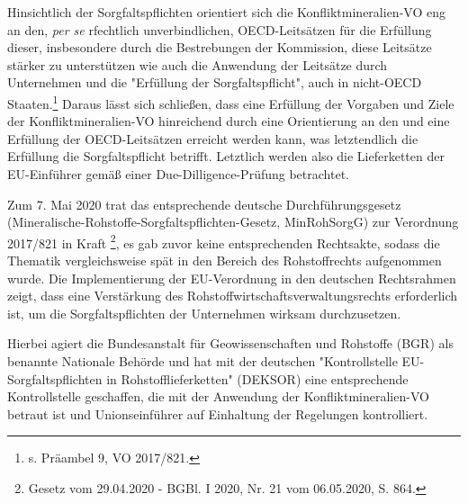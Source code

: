 \documentclass[12pt,a4paper,oneside]{book} %
\begin{document}
{	Hinsichtlich der Sorgfaltspflichten orientiert sich die Konfliktmineralien-VO eng an den, \textit{per se} rfechtlich unverbindlichen, OECD-Leitsätzen \autocite{OECDleitfaden2019} für die Erfüllung dieser, insbesondere durch die Bestrebungen der Kommission, diese Leitsätze stärker zu unterstützen wie auch die Anwendung der Leitsätze durch Unternehmen und die "Erfüllung der Sorgfaltspflicht", auch in nicht-OECD Staaten.\footnote{s. Präambel 9, VO 2017/821.} Daraus lässt sich schließen, dass eine Erfüllung der Vorgaben und Ziele der Konfliktmineralien-VO hinreichend durch eine Orientierung an den und eine Erfüllung der OECD-Leitsätzen erreicht werden kann, was letztendlich die Erfüllung die Sorgfaltspflicht betrifft. Letztlich werden also die Lieferketten der EU-Einführer gemäß einer Due-Dilligence-Prüfung betrachtet.\autocite[Rn. 390]{ruttloff_lieferkettensorgfaltspflichtengesetz_2022}
	
	
	
	Zum 7. Mai 2020 trat das entsprechende deutsche Durchführungsgesetz (Mineralische-Rohstoffe-Sorgfaltspflichten-Gesetz, MinRohSorgG) zur Verordnung 2017/821 in Kraft \footnote{Gesetz vom 29.04.2020 - BGBl. I 2020, Nr. 21 vom 06.05.2020, S. 864.}, es gab zuvor keine entsprechenden Rechtsakte, sodass die Thematik vergleichsweise spät in den Bereich des Rohstoffrechts aufgenommen wurde. Die Implementierung der EU-Verordnung in den deutschen Rechtsrahmen zeigt, dass eine Verstärkung des Rohstoffwirtschaftsverwaltungsrechts erforderlich ist, um die Sorgfaltspflichten der Unternehmen wirksam durchzusetzen.
	
	Hierbei agiert die Bundesanstalt für Geowissenschaften und Rohstoffe (BGR) als benannte Nationale Behörde und hat mit der deutschen "Kontrollstelle EU-Sorgfaltspflichten in Rohstofflieferketten" (DEKSOR) eine entsprechende Kontrollstelle geschaffen, die mit der Anwendung der Konfliktmineralien-VO betraut ist und Unionseinführer auf Einhaltung der Regelungen kontrolliert. 
	
}
\end{document}
